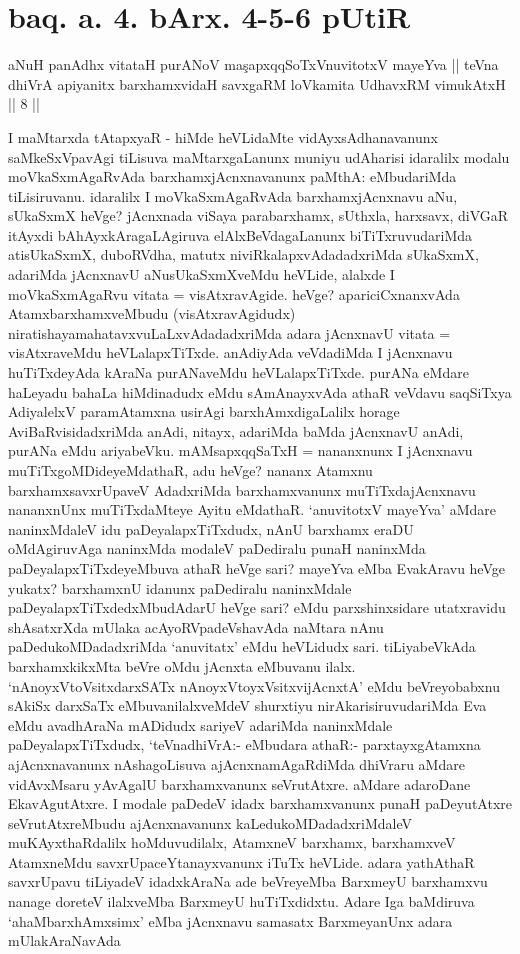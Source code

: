 \section*{baq. a. 4. bArx. 4-5-6 pUtiR}


\begin{shl}
aNuH panAdhx vitataH purANoV ma\c sapxqqSoTxV\s nuvitotxV mayeYva ||
teVna dhiVrA apiyanitx barxhamxvidaH savxgaRM loVkamita UdhavxRM vimukAtxH || 8 ||
\end{shl}

\begin{artha}
I maMtarxda tAtapxyaR - hiMde heVLidaMte vidAyxsAdhanavanunx saMkeSxVpavAgi tiLisuva maMtarxgaLanunx muniyu udAharisi idaralilx modalu moVkaSxmAgaRvAda barxhamxjAcnxnavanunx paMthA: eMbudariMda tiLisiruvanu. idaralilx I moVkaSxmAgaRvAda barxhamxjAcnxnavu aNu, sUkaSxmX heVge? jAcnxnada viSaya parabarxhamx, sUthxla, harxsavx, diVGaR itAyxdi bAhAyxkAragaLAgiruva elAlxBeVdagaLanunx biTiTxruvudariMda atisUkaSxmX, duboRVdha, matutx niviRkalapxvAdadadxriMda sUkaSxmX, adariMda jAcnxnavU aNusUkaSxmXveMdu heVLide, alalxde I moVkaSxmAgaRvu vitata = visAtxravAgide. heVge? apariciCxnanxvAda AtamxbarxhamxveMbudu (visAtxravAgidudx) niratishayamahatavxvuLaLxvAdadadxriMda adara jAcnxnavU vitata = visAtxraveMdu heVLalapxTiTxde. anAdiyAda veVdadiMda I jAcnxnavu huTiTxdeyAda kAraNa purANaveMdu heVLalapxTiTxde. purANa eMdare haLeyadu bahaLa hiMdinadudx eMdu sAmAnayxvAda athaR veVdavu saqSiTxya AdiyalelxV paramAtamxna usirAgi barxhAmxdigaLalilx horage AviBaRvisidadxriMda anAdi, nitayx, adariMda baMda jAcnxnavU anAdi, purANa eMdu ariyabeVku. mAMsapxqqSaTxH = nananxnunx I jAcnxnavu muTiTxgoMDideyeMdathaR, adu heVge? nananx Atamxnu barxhamxsavxrUpaveV AdadxriMda barxhamxvanunx muTiTxdajAcnxnavu nananxnUnx muTiTxdaMteye Ayitu eMdathaR. `anuvitotxV mayeYva' aMdare naninxMdaleV idu paDeyalapxTiTxdudx, nAnU barxhamx eraDU oMdAgiruvAga naninxMda modaleV paDediralu punaH naninxMda paDeyalapxTiTxdeyeMbuva athaR heVge sari? mayeYva eMba EvakAravu heVge yukatx? barxhamxnU idanunx paDediralu naninxMdale paDeyalapxTiTxdedxMbudAdarU heVge sari? eMdu parxshinxsidare utatxravidu shAsatxrXda mUlaka acAyoRVpadeVshavAda naMtara nAnu paDedukoMDadadxriMda `anuvitatx' eMdu heVLidudx sari. tiLiyabeVkAda barxhamxkikxMta beVre oMdu jAcnxta eMbuvanu ilalx. `nAnoyxV\s toV\s sitxdarxSATx nAnoyxVtoyxVsitxvijAcnxtA' eMdu beVreyobabxnu sAkiSx darxSaTx eMbuvanilalxveMdeV shurxtiyu nirAkarisiruvudariMda Eva eMdu avadhAraNa mADidudx sariyeV adariMda naninxMdale paDeyalapxTiTxdudx, `teVnadhiVrA:- eMbudara athaR:- parxtayxgAtamxna ajAcnxnavanunx nAshagoLisuva ajAcnxnamAgaRdiMda dhiVraru aMdare vidAvxMsaru yAvAgalU barxhamxvanunx seVrutAtxre. aMdare adaroDane EkavAgutAtxre. I modale paDedeV idadx barxhamxvanunx punaH paDeyutAtxre seVrutAtxreMbudu ajAcnxnavanunx kaLedukoMDadadxriMdaleV muKAyxthaRdalilx hoMduvudilalx, AtamxneV barxhamx, barxhamxveV AtamxneMdu savxrUpaceYtanayxvanunx iTuTx heVLide. adara yathAthaR savxrUpavu tiLiyadeV idadxkAraNa ade beVreyeMba BarxmeyU barxhamxvu nanage doreteV ilalxveMba BarxmeyU huTiTxdidxtu. Adare Iga baMdiruva `ahaMbarxhAmxsimx' eMba jAcnxnavu samasatx BarxmeyanUnx adara mUlakAraNavAda 
\end{artha}
